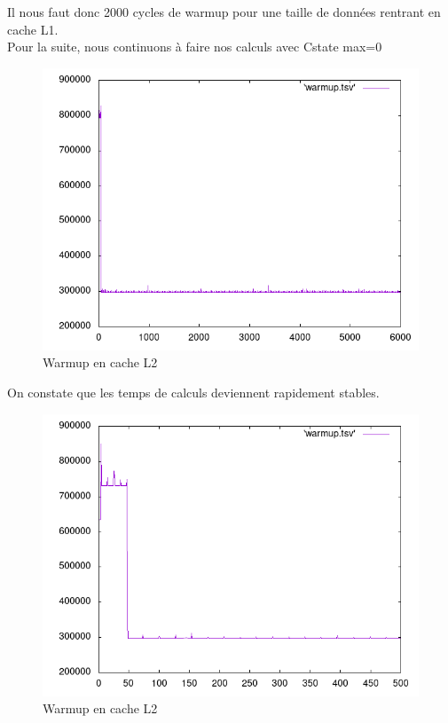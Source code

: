 \documentclass{report}
\begin{document}
Il nous faut donc 2000 cycles de warmup pour une taille de données rentrant en cache L1.\\

Pour la suite, nous continuons à faire nos calculs avec Cstate max=0
\newpage
    \begin{figure}[ht!]
        \centering
        \includegraphics[width=120mm]{MEDIA/warmupL2_NOCstate.png}
        \caption{Warmup en cache L2}
    \end{figure}

On constate que les temps de calculs deviennent rapidement stables.

\newpage
    \begin{figure}[ht!]
        \centering
        \includegraphics[width=120mm]{MEDIA/closeup.png}
        \caption{Warmup en cache L2}
    \end{figure}
\end{document}
